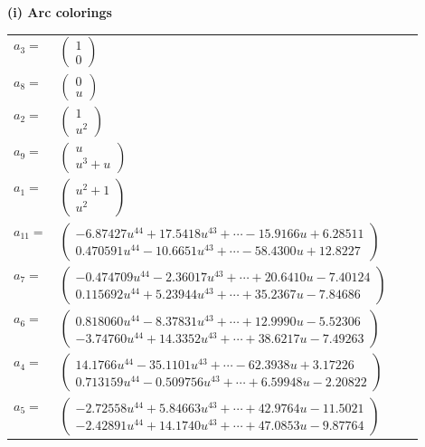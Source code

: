 \documentclass[1p]{elsarticle_modified}
\theoremstyle{definition}
\begin{document}
\flushleft \textbf{(i) Arc colorings}\\
\begin{tabular}{m{7pt} m{180pt} m{7pt} m{180pt} }
\flushright $a_{3}=$&$\begin{pmatrix}1\\0\end{pmatrix}$ \\
\flushright $a_{8}=$&$\begin{pmatrix}0\\u\end{pmatrix}$ \\
\flushright $a_{2}=$&$\begin{pmatrix}1\\u^2\end{pmatrix}$ \\
\flushright $a_{9}=$&$\begin{pmatrix}u\\u^3+u\end{pmatrix}$ \\
\flushright $a_{1}=$&$\begin{pmatrix}u^2+1\\u^2\end{pmatrix}$ \\
\flushright $a_{11}=$&$\begin{pmatrix}-6.87427 u^{44}+17.5418 u^{43}+\cdots-15.9166 u+6.28511\\0.470591 u^{44}-10.6651 u^{43}+\cdots-58.4300 u+12.8227\end{pmatrix}$ \\
\flushright $a_{7}=$&$\begin{pmatrix}-0.474709 u^{44}-2.36017 u^{43}+\cdots+20.6410 u-7.40124\\0.115692 u^{44}+5.23944 u^{43}+\cdots+35.2367 u-7.84686\end{pmatrix}$ \\
\flushright $a_{6}=$&$\begin{pmatrix}0.818060 u^{44}-8.37831 u^{43}+\cdots+12.9990 u-5.52306\\-3.74760 u^{44}+14.3352 u^{43}+\cdots+38.6217 u-7.49263\end{pmatrix}$ \\
\flushright $a_{4}=$&$\begin{pmatrix}14.1766 u^{44}-35.1101 u^{43}+\cdots-62.3938 u+3.17226\\0.713159 u^{44}-0.509756 u^{43}+\cdots+6.59948 u-2.20822\end{pmatrix}$ \\
\flushright $a_{5}=$&$\begin{pmatrix}-2.72558 u^{44}+5.84663 u^{43}+\cdots+42.9764 u-11.5021\\-2.42891 u^{44}+14.1740 u^{43}+\cdots+47.0853 u-9.87764\end{pmatrix}$ \\

\end{tabular}
\end{document}

